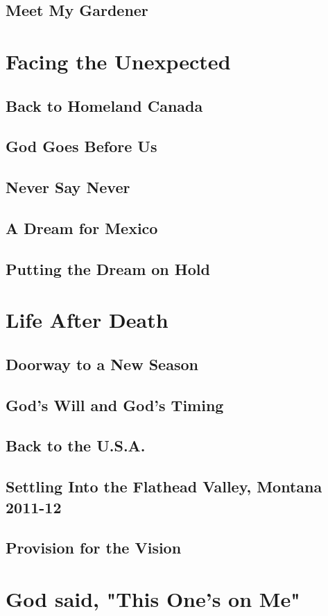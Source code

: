 \documentclass[oneside]{book}
\begin{document}
\section{Meet My Gardener}
\chapter{Facing the Unexpected}
\section{Back to Homeland Canada}
\section{God Goes Before Us}
\section{Never Say Never}
\section{A Dream for Mexico}
\section{Putting the Dream on Hold}
\chapter{Life After Death}
\section{Doorway to a New Season}
\section{God's Will and God's Timing}
\section{Back to the U.S.A.}
\section{Settling Into the Flathead Valley, Montana 2011-12}
\section{Provision for the Vision}
\chapter{God said, "This One's on Me"}
\end{document}

